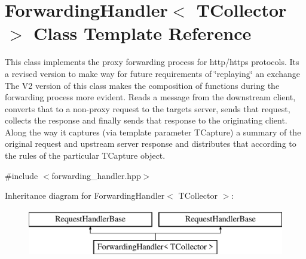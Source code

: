 \hypertarget{class_forwarding_handler}{}\section{Forwarding\+Handler$<$ T\+Collector $>$ Class Template Reference}
\label{class_forwarding_handler}


This class implements the proxy forwarding process for http/https protocols. Its a revised version to make way for future requirements of \char`\"{}replaying\char`\"{} an exchange The V2 version of this class makes the composition of functions during the forwarding process more evident.  Reads a message from the downstream client, converts that to a non-\/proxy request to the targets server, sends that request, collects the response and finally sends that response to the originating client. Along the way it captures (via template parameter T\+Capture) a summary of the original request and upstream server response and distributes that according to the rules of the particular T\+Capture object.  




{\ttfamily \#include $<$forwarding\+\_\+handler.\+hpp$>$}

Inheritance diagram for Forwarding\+Handler$<$ T\+Collector $>$\+:\begin{figure}[H]
\begin{center}
\leavevmode
\includegraphics[height=2.000000cm]{class_forwarding_handler}
\end{center}
\end{figure}
